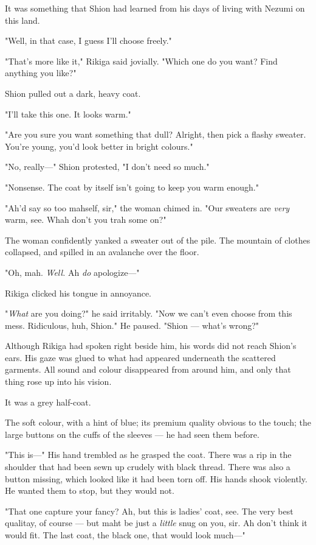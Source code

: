 It was something that Shion had learned from his days of living with
Nezumi on this land.

"Well, in that case, I guess I'll choose freely."

"That's more like it," Rikiga said jovially. "Which one do you want?
Find anything you like?"

Shion pulled out a dark, heavy coat.

"I'll take this one. It looks warm."

"Are you sure you want something that dull? Alright, then pick a flashy
sweater. You're young, you'd look better in bright colours."

"No, really---" Shion protested, "I don't need so much."

"Nonsense. The coat by itself isn't going to keep you warm enough."

"Ah'd say so too mahself, sir," the woman chimed in. "Our sweaters are
\emph{very} warm, see. Whah don't you trah some on?"

The woman confidently yanked a sweater out of the pile. The mountain of
clothes collapsed, and spilled in an avalanche over the floor.

"Oh, mah. \emph{Well.} Ah \emph{do} apologize---"

Rikiga clicked his tongue in annoyance.

"\emph{What} are you doing?" he said irritably. "Now we can't even choose from
this mess. Ridiculous, huh, Shion." He paused. "Shion --- what's wrong?"

Although Rikiga had spoken right beside him, his words did not reach
Shion's ears. His gaze was glued to what had appeared underneath the
scattered garments. All sound and colour disappeared from around him,
and only that thing rose up into his vision.

It was a grey half-coat.

The soft colour, with a hint of blue; its premium quality obvious to the
touch; the large buttons on the cuffs of the sleeves --- he had seen them
before.

"This is---" His hand trembled as he grasped the coat. There was a rip in
the shoulder that had been sewn up crudely with black thread. There was
also a button missing, which looked like it had been torn off. His hands
shook violently. He wanted them to stop, but they would not.

"That one capture your fancy? Ah, but this is ladies' coat, see. The
very best qualitay, of course --- but maht be just a \emph{little} snug on you,
sir. Ah don't think it would fit. The last coat, the black one, that
would look much---"

